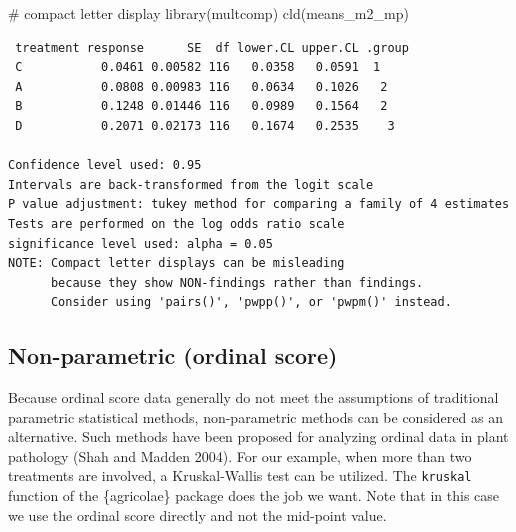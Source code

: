 \documentclass[
  letterpaper,
]{book}
\newenvironment{Shaded}{\begin{snugshade}}{\end{snugshade}}
\newcommand{\AttributeTok}[1]{\textcolor[rgb]{0.40,0.45,0.13}{#1}}
\newcommand{\CommentTok}[1]{\textcolor[rgb]{0.37,0.37,0.37}{#1}}
\newcommand{\ConstantTok}[1]{\textcolor[rgb]{0.56,0.35,0.01}{#1}}
\newcommand{\FunctionTok}[1]{\textcolor[rgb]{0.28,0.35,0.67}{#1}}
\newcommand{\NormalTok}[1]{\textcolor[rgb]{0.00,0.23,0.31}{#1}}
\newcommand{\SpecialCharTok}[1]{\textcolor[rgb]{0.37,0.37,0.37}{#1}}
\begin{document}
\begin{Shaded}
\begin{Highlighting}[]
\CommentTok{\# compact letter display}
\FunctionTok{library}\NormalTok{(multcomp)}
\FunctionTok{cld}\NormalTok{(means\_m2\_mp)}
\end{Highlighting}
\end{Shaded}

\begin{verbatim}
 treatment response      SE  df lower.CL upper.CL .group
 C           0.0461 0.00582 116   0.0358   0.0591  1    
 A           0.0808 0.00983 116   0.0634   0.1026   2   
 B           0.1248 0.01446 116   0.0989   0.1564   2   
 D           0.2071 0.02173 116   0.1674   0.2535    3  

Confidence level used: 0.95 
Intervals are back-transformed from the logit scale 
P value adjustment: tukey method for comparing a family of 4 estimates 
Tests are performed on the log odds ratio scale 
significance level used: alpha = 0.05 
NOTE: Compact letter displays can be misleading
      because they show NON-findings rather than findings.
      Consider using 'pairs()', 'pwpp()', or 'pwpm()' instead. 
\end{verbatim}

\hypertarget{non-parametric-ordinal-score}{%
\subsection{Non-parametric (ordinal
score)}\label{non-parametric-ordinal-score}}

Because ordinal score data generally do not meet the assumptions of
traditional parametric statistical methods, non-parametric methods can
be considered as an alternative. Such methods have been proposed for
analyzing ordinal data in plant pathology (Shah and Madden 2004). For
our example, when more than two treatments are involved, a
Kruskal-Wallis test can be utilized. The \texttt{kruskal} function of
the \{agricolae\} package does the job we want. Note that in this case
we use the ordinal score directly and not the mid-point value.

\begin{Shaded}
\end{Shaded}
\end{document}
